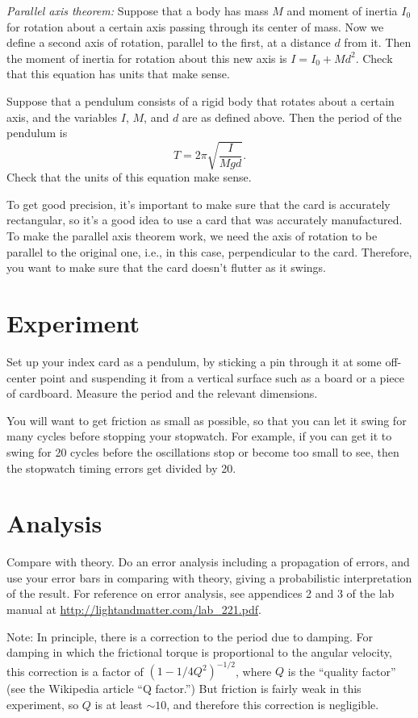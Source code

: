 \emph{Parallel axis theorem:} Suppose that a body has mass $M$ and moment of inertia $I_0$ for rotation about a certain axis passing
through its center of mass. Now we define a second axis of rotation, parallel to the first, at a distance $d$ from it.
Then the moment of inertia for rotation about this new axis is $I=I_0+Md^2$.
Check that this equation has units that make sense.

Suppose that a pendulum consists of a rigid body that rotates about a certain axis, and the variables $I$, $M$, and $d$ are
as defined above. Then the period of the pendulum is
\begin{equation}
  T = 2\pi \sqrt{\frac{I}{Mgd}}.
\end{equation}
Check that the units of this equation make sense.

To get good precision, it's important to make sure that the card is accurately rectangular, so it's a good
idea to use a card that was accurately manufactured. To make the parallel axis theorem work, we need the
axis of rotation to be parallel to the original one, i.e., in this case, perpendicular to the card. Therefore,
you want to make sure that the card doesn't flutter as it swings.

\section*{Experiment}
Set up your index card as a pendulum, by sticking a pin through it at some off-center point and
suspending it from a vertical surface such as a board or a piece of cardboard. Measure the period
and the relevant dimensions.

You will want to get friction as small as possible, so that you can let it swing for many cycles
before stopping your stopwatch. For example, if you can get it to swing for 20 cycles before the
oscillations stop or become too small to see, then the stopwatch timing errors get divided by 20.

\section*{Analysis}
Compare with theory. Do an error analysis including a propagation of errors, and use your
error bars in comparing with theory, giving a probabilistic interpretation of the result.
For reference on error analysis, see appendices 2 and 3 of the lab manual at
\url{http://lightandmatter.com/lab_221.pdf}.

Note: In principle, there is a correction to the period due to damping. For damping in which
the frictional torque is proportional to the angular velocity, this correction is
a factor of $(1-1/4Q^2)^{-1/2}$, where $Q$ is the ``quality factor'' (see the Wikipedia
article ``Q factor.'') But friction is fairly weak in this experiment, so $Q$ is at least
$\sim 10$, and therefore this correction is negligible.
